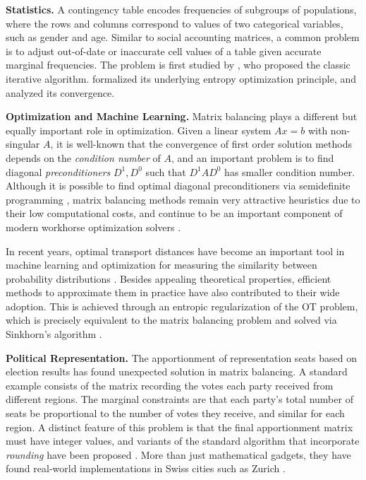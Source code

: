 \textbf{Statistics.}
A contingency table encodes frequencies of subgroups of populations, where the rows and columns correspond to values of two categorical variables, such as gender and age. Similar to social accounting matrices, a common problem is to adjust out-of-date or inaccurate cell values of a table given accurate marginal frequencies. The problem is first studied by  \citet{deming1940least}, who proposed the classic iterative algorithm. \citet{ireland1968contingency} formalized its underlying entropy optimization principle, and \citet{fienberg1970iterative} analyzed its convergence. 

\textbf{Optimization and Machine Learning.} Matrix balancing plays a different but equally important role in optimization. Given a linear system $Ax=b$ with non-singular $A$, it is well-known that the convergence of first order solution methods depends on the \emph{condition number} of $A$, and an important problem is to find diagonal \emph{preconditioners} $D^1,D^0$ such that $D^1AD^0$ has smaller condition number. Although it is possible to find optimal diagonal preconditioners via semidefinite programming \citep{boyd1994linear,qu2022optimal}, matrix balancing methods remain very attractive heuristics due to their low computational costs, and continue to be an important component of modern workhorse optimization solvers \citep{ruiz2001scaling,bradley2010algorithms,knight2013fast,stellato2020osqp,gao2022hdsdp}.

In recent years, optimal transport distances have become an important tool in machine learning and optimization for measuring the similarity between probability distributions \citep{arjovsky2017wasserstein,peyre2019computational,blanchet2019robust,mohajerin2018data,kuhn2019wasserstein}. Besides appealing theoretical properties, efficient methods to approximate them in practice have also contributed to their wide adoption. This is achieved through an entropic regularization of the OT problem, which is precisely equivalent to the matrix balancing problem and solved via Sinkhorn's algorithm \citep{cuturi2013sinkhorn,altschuler2017near,dvurechensky2018computational}.   

\textbf{Political Representation.} The apportionment of representation seats based on election results has found unexpected solution in matrix balancing. A standard example consists of the matrix recording the votes each party received from different regions. The marginal constraints are that each party's total number of seats be proportional to the number of votes they receive, and similar for each region. A distinct feature of this problem is that the final apportionment matrix must have integer values, and variants of the standard algorithm that incorporate \emph{rounding} have been proposed \citep{balinski2006matrices,pukelsheim2006current,maier2010divisor}. More than just mathematical gadgets, they have found real-world implementations in Swiss cities such as Zurich \citep{pukelsheim2009iterative}.


